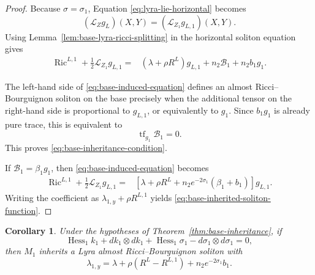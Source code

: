 \documentclass[a4paper,11pt]{article}
\theoremstyle{plain}
\newtheorem{corollary} {Corollary}[section]
\numberwithin{equation}{section}
\begin{document}
\begin{proof}
	Because \(\sigma=\sigma_{1}\), Equation
	\eqref{eq:lyra-lie-horizontal} becomes
	\begin{equation}
		(\mathcal L_{Z}g_{L})(X,Y)
		=
		(\mathcal L_{Z_{1}}g_{L,1})(X,Y).
		\label{eq:base-lie-inheritance}
	\end{equation}
	Using Lemma~\ref{lem:base-lyra-ricci-splitting} in the
	horizontal soliton equation gives
	\begin{align}
		\operatorname{Ric}^{L,1}
		+
		\frac{1}{2}
		\mathcal L_{Z_{1}}g_{L,1}
		={}&
		\left(
		\lambda+\rho R^{L}
		\right)g_{L,1}
		+
		n_{2}\mathcal B_{1}
		+
		n_{2}b_{1}g_{1}.
		\label{eq:base-induced-equation}
	\end{align}
	
	The left-hand side of \eqref{eq:base-induced-equation} defines
	an almost Ricci--Bourguignon soliton on the base precisely when
	the additional tensor on the right-hand side is proportional
	to \(g_{L,1}\), or equivalently to \(g_{1}\). Since
	\(b_{1}g_{1}\) is already pure trace, this is equivalent to
	\[
	\operatorname{tf}_{g_{1}}\mathcal B_{1}=0.
	\]
	This proves \eqref{eq:base-inheritance-condition}.
	
	If \(\mathcal B_{1}=\beta_{1}g_{1}\), then
	\eqref{eq:base-induced-equation} becomes
	\begin{align*}
		\operatorname{Ric}^{L,1}
		+
		\frac{1}{2}
		\mathcal L_{Z_{1}}g_{L,1}
		={}&
		\left[
		\lambda
		+
		\rho R^{L}
		+
		n_{2}e^{-2\sigma_{1}}
		\left(
		\beta_{1}+b_{1}
		\right)
		\right]g_{L,1}.
	\end{align*}
	Writing the coefficient as
	\(\lambda_{1,y}+\rho R^{L,1}\) yields
	\eqref{eq:base-inherited-soliton-function}.
\end{proof}

\begin{corollary}
	\label{cor:base-inheritance-vanishing}
	Under the hypotheses of Theorem~\ref{thm:base-inheritance},
	if
	\begin{equation}
		\operatorname{Hess}_{1}k_{1}
		+
		dk_{1}\otimes dk_{1}
		+
		\operatorname{Hess}_{1}\sigma_{1}
		-
		d\sigma_{1}\otimes d\sigma_{1}
		=
		0,
		\label{eq:base-defect-vanishing}
	\end{equation}
	then \(M_{1}\) inherits a Lyra almost
	Ricci--Bourguignon soliton with
	\begin{equation}
		\lambda_{1,y}
		=
		\lambda
		+
		\rho
		\left(
		R^{L}-R^{L,1}
		\right)
		+
		n_{2}e^{-2\sigma_{1}}b_{1}.
		\label{eq:base-inheritance-vanishing-function}
	\end{equation}
\end{corollary}
\end{document}
